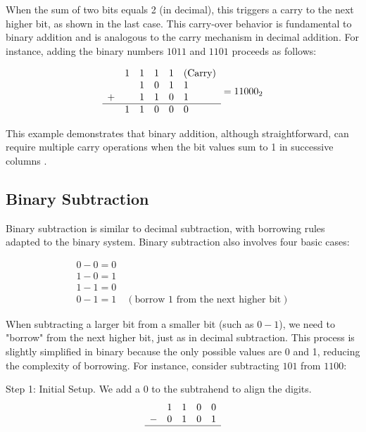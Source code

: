 When the sum of two bits equals 2 (in decimal), this triggers a carry to the next higher bit, as shown in the last case. This carry-over behavior is fundamental to binary addition and is analogous to the carry mechanism in decimal addition. For instance, adding the binary numbers \( 1011 \) and \( 1101 \) proceeds as follows:

\[
\begin{array}{cccccl}
  & 1& 1 & 1 & 1 &     (\text{Carry}) \\ %
  &  & 1 & 0 & 1 & 1    \\ %
+ &  & 1 & 1 & 0 & 1    \\ %
  \hline
  & 1 & 1 & 0 & 0 & 0    \\ %
\end{array} = 11000_2
\]

This example demonstrates that binary addition, although straightforward, can require multiple carry operations when the bit values sum to 1 in successive columns \cite{knuth1997}.

\subsection{Binary Subtraction}
Binary subtraction is similar to decimal subtraction, with borrowing rules adapted to the binary system. Binary subtraction also involves four basic cases:

\[
\begin{array}{l}
    0 - 0 = 0 \\
    1 - 0 = 1 \\
    1 - 1 = 0 \\
    0 - 1 = 1 \quad (\text{borrow 1 from the next higher bit})
\end{array}
\]

When subtracting a larger bit from a smaller bit (such as \( 0 - 1 \)), we need to "borrow" from the next higher bit, just as in decimal subtraction. This process is slightly simplified in binary because the only possible values are 0 and 1, reducing the complexity of borrowing. For instance, consider subtracting \( 101 \) from \( 1100 \):

Step 1: Initial Setup. We add a 0 to the subtrahend to align the digits.
\[
\begin{array}{rcccc}
    & 1 & 1 & 0 & 0 \\ %
  - & 0 & 1 & 0 & 1 \\ %
  \hline
    &   &   &   &   \\
\end{array}
\]


